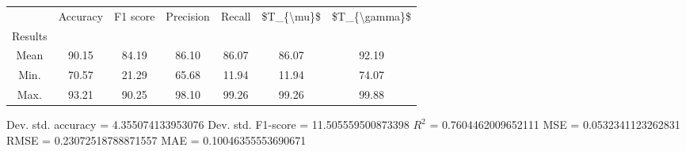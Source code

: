 \begin{tabular}{|c|c|c|c|c|c|c|}
\toprule
{} &  Accuracy &  F1 score &  Precision &  Recall &  \$T\_\{\textbackslash mu\}\$ &  \$T\_\{\textbackslash gamma\}\$ \\
Results &           &           &            &         &            &               \\
\hline
Mean    &     90.15 &     84.19 &      86.10 &   86.07 &      86.07 &         92.19 \\
Min.    &     70.57 &     21.29 &      65.68 &   11.94 &      11.94 &         74.07 \\
Max.    &     93.21 &     90.25 &      98.10 &   99.26 &      99.26 &         99.88 \\
\bottomrule
\end{tabular}

 Dev. std. accuracy = 4.355074133953076
 Dev. std. F1-score = 11.505559500873398
 $R^2$ = 0.7604462009652111
 MSE = 0.0532341123262831
 RMSE = 0.23072518788871557
 MAE = 0.10046355553690671